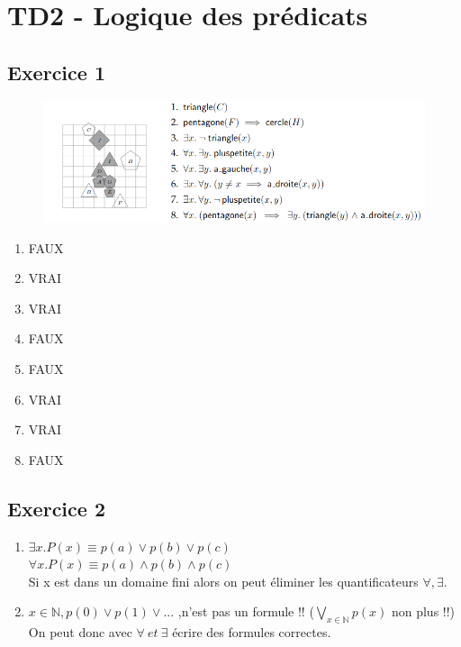 \documentclass[a4paper]{article}
\begin{document}
\section*{TD2 - Logique des prédicats}
\begin{spacing}{1.25}
\subsection*{Exercice 1}
\begin{figure}[!h]
  \includegraphics[scale = 0.67]{ex1_td2}
\end{figure}
\begin{enumerate}
  \item  FAUX
  \item VRAI
  \item VRAI
  \item FAUX
  \item FAUX
  \item VRAI
  \item VRAI
  \item FAUX
\end{enumerate}

\subsection*{Exercice 2}
\begin{enumerate}
  \item $\exists x.P(x) \equiv p(a)\lor p(b) \lor p(c)$\\
    $\forall x.P(x) \equiv p(a)\land p(b) \land p(c)$\\
    Si x est dans un domaine fini alors on peut éliminer les quantificateurs $\forall ,\exists$.\\
    \item $x \in \mathbb{N} , p(0)\lor p(1) \lor ...$ ,n'est pas un formule !! ($\bigvee_{x\in \mathbb{N}}p(x)$ non plus !!)\\
    On peut donc avec \emph{ $\forall \:et\: \exists $ } écrire des formules correctes.\\
\end{enumerate}

\end{spacing}
\end{document}
